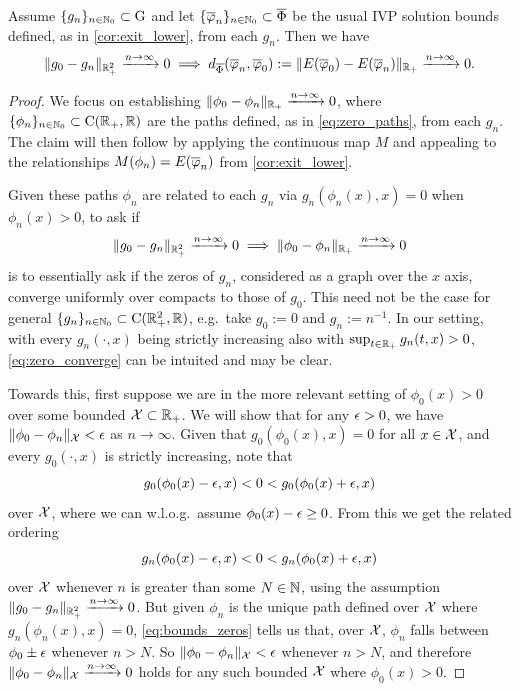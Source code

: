 \begin{lemma}\label{lem:bounds_converge}
    Assume $\{g_n\}_{n\in\mathbb{N}_0}\subset\mathrm{G}$ and let $\{\overline{\varphi}_n\}_{n\in\mathbb{N}_0}\subset\overline{\Phi}$ be the usual IVP solution bounds defined, as in \autoref{cor:exit_lower}, from each $g_n$. Then we have
    \begin{equation}
        \Vert g_0 - g_n \Vert_{\mathbb{R}^2_+}\xrightarrow{n\to\infty}0 \implies d_{\overline{\Phi}}(\overline{\varphi}_n,\overline{\varphi}_0) := \Vert E(\overline{\varphi}_0) - E(\overline{\varphi}_n) \Vert_{\mathbb{R}_+}\xrightarrow{n\to\infty}0.
    \end{equation}
\end{lemma}
\begin{proof}
    We focus on establishing $\Vert \phi_0 - \phi_n\Vert_{\mathbb{R}_+} \xrightarrow{n\to\infty}0$, where $\{\phi_n\}_{n\in\mathbb{N}_0}\subset\mathrm{C}(\mathbb{R}_+,\mathbb{R})$ are the paths defined, as in \autoref{eq:zero_paths}, from each $g_n$. The claim will then follow by applying the continuous map $M$ and appealing to the relationships $M(\phi_n) = E(\overline{\varphi}_n)$ from \autoref{cor:exit_lower}.

    Given these paths $\phi_n$ are related to each $g_n$ via $g_n(\phi_n(x),x)=0$ when $\phi_n(x)>0$, to ask if
    \begin{equation}\label{eq:zero_converge}
        \Vert g_0 - g_n \Vert_{\mathbb{R}_+^2}\xrightarrow{n\to\infty}0 \implies \Vert \phi_0 - \phi_n \Vert_{\mathbb{R}_+}\xrightarrow{n\to\infty}0
    \end{equation}
    is to essentially ask if the zeros of $g_n$, considered as a graph over the $x$ axis, converge uniformly over compacts to those of $g_0$. This need not be the case for general $\{g_n\}_{n\in\mathbb{N}_0}\subset\mathrm{C}(\mathbb{R}_+^2,\mathbb{R})$, e.g.~take $g_0:=0$ and $g_n:=n^{-1}$. In our setting, with every $g_n(\cdot,x)$ being strictly increasing also with $\sup_{t\in\mathbb{R}_+}g_n(t,x)>0$, \autoref{eq:zero_converge} can be intuited and may be clear.

    Towards this, first suppose we are in the more relevant setting of $\phi_0(x)>0$ over some bounded $\mathcal{X}\subset\mathbb{R}_+$. We will show that for any $\epsilon>0$, we have $\Vert\phi_0-\phi_n\Vert_{\mathcal{X}}<\epsilon$ as $n\to\infty$. Given that $g_0(\phi_0(x),x)=0$ for all $x\in\mathcal{X}$, and every $g_0(\cdot,x)$ is strictly increasing, note that
    \begin{equation}
        g_0(\phi_0(x)-\epsilon,x)< 0 < g_0(\phi_0(x)+\epsilon,x)
    \end{equation}
    over $\mathcal{X}$, where we can w.l.o.g.~assume $\phi_0(x)-\epsilon\ge 0$. From this we get the related ordering
    \begin{equation}\label{eq:bounds_zeros}
        g_n(\phi_0(x)-\epsilon,x)< 0 < g_n(\phi_0(x)+\epsilon,x)
    \end{equation}
    over $\mathcal{X}$ whenever $n$ is greater than some $N\in\mathbb{N}$, using the assumption $\Vert g_0 - g_n \Vert_{\mathbb{R}_+^2}\xrightarrow{n\to\infty}0$. But given $\phi_n$ is the unique path defined over $\mathcal{X}$ where $g_n(\phi_n(x),x)=0$, \autoref{eq:bounds_zeros} tells us that, over $\mathcal{X}$, $\phi_n$ falls between $\phi_0\pm \epsilon$ whenever $n>N$. So $\Vert\phi_0-\phi_n\Vert_{\mathcal{X}}<\epsilon$ whenever $n>N$, and therefore $\Vert\phi_0-\phi_n\Vert_{\mathcal{X}}\xrightarrow{n\to\infty}0$ holds for any such bounded $\mathcal{X}$ where $\phi_0(x)>0$.


\end{proof}

